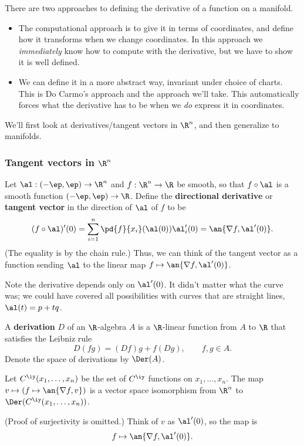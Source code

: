 There are two approaches to defining the derivative of a function on a manifold. 
\begin{itemize}
\item
The computational approach is to give it in terms of coordinates, and define how it transforms when we change coordinates. In this approach we {\it immediately} know how to compute with the derivative, but we have to show it is well defined.
\item
We can define it in a more abstract way, invariant under choice of charts. This is Do Carmo's approach and the approach we'll take. This automatically forces what the derivative has to be when we \emph{do} express it in coordinates.
\end{itemize}

We'll first look at derivatives/tangent vectors in $\R^n$, and then generalize to manifolds.
\subsubsection{Tangent vectors in $\R^n$}
\begin{df}
Let $\al:(-\ep,\ep)\to \R^n$ and $f:\R^n\to \R$ be smooth, so that $f\circ \al$ is a smooth function $(-\ep,\ep)\to \R$.
Define the \textbf{directional derivative} or \textbf{tangent vector} in the direction of $\al$ of $f$ to be 
\[
(f\circ \al)'(0)=\sum_{i=1}^n \pd{f}{x_i} (\al(0))\al_i'(0)=\an{\nabla f,\al'(0)}.
\]
(The equality is by the chain rule.)
Thus, we can think of the tangent vector as a function sending $\al$ to the linear map $f\mapsto \an{\nabla f,\al'(0)}$.
\end{df}
Note the derivative depends only on $\al'(0)$. It didn't matter what the curve was; we could have covered all possibilities with curves that are straight lines, $\al(t)=p+tq$.

\begin{df}
A \textbf{derivation} $D$ of an $\R$-algebra $A$ is a $\R$-linear function from $A$ to $\R$ that satisfies the Leibniz rule \[D(fg)=(Df)g+f(Dg),\qquad f,g\in A.\]
Denote the space of derivations by $\Der(A)$.
\end{df}
\begin{pr}
Let $C^{\iy}(x_1,\ldots, x_n)$ be the set of $C^{\iy}$ functions on $x_1,\ldots, x_n$.
The map $v\mapsto (f\mapsto \an{\nabla f,v})$ is a vector space isomorphism from $\R^n$ to $\Der(C^{\iy}(x_1,\ldots, x_n))$.
\end{pr}
(Proof of surjectivity is omitted.) Think of $v$ as $\al'(0)$, so the map is
\[
f\mapsto \an{\nabla f,\al'(0)}.
\]

